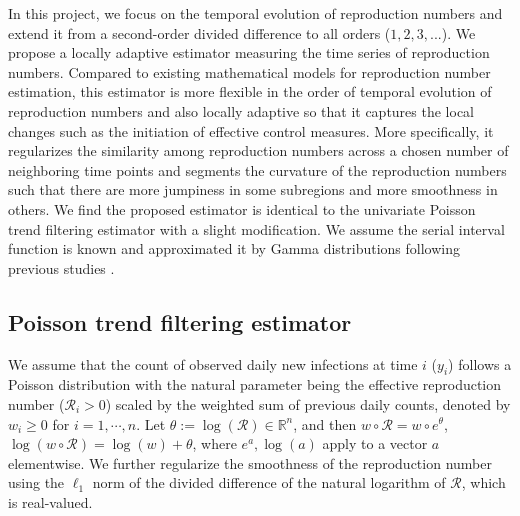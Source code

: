\documentclass[10pt,letterpaper]{article}
\def\calR{\mathcal{R}}
\begin{document}
In this project, we focus on the temporal evolution of reproduction numbers and extend it from a second-order divided difference to all orders ($1,2,3,...$). We propose a locally adaptive estimator measuring the time series of reproduction numbers. Compared to existing mathematical models for reproduction number estimation, this estimator is more flexible in the order of temporal evolution of reproduction numbers and also locally adaptive so that it captures the local changes such as the initiation of effective control measures. More specifically, it regularizes the similarity among reproduction numbers across a chosen number of neighboring time points and segments the curvature of the reproduction numbers such that there are more jumpiness in some subregions and more smoothness in others. We find the proposed estimator is identical to the univariate Poisson trend filtering estimator with a slight modification. We assume the serial interval function is known and approximated it by Gamma distributions following previous studies \cite{cori2013new,thompson2019improved,abry2020spatial,pascal2022nonsmooth}.

\subsection*{Poisson trend filtering estimator} %

We assume that the count of observed daily new infections at time $i$ ($y_i$) follows a Poisson distribution with the natural parameter being the effective reproduction number ($\calR_i > 0$) scaled by the weighted sum of previous daily counts, denoted by $w_i \geq 0$ for $i=1,\cdots,n$. %
Let $\theta:=\log(\calR) \in \mathbb{R}^n$, and then $w\circ \calR = w\circ e^{\theta}$, $\log(w\circ \calR) = \log(w) + \theta$, where $e^{a}, \log(a)$ apply to a vector $a$ elementwise. We further regularize the smoothness of the reproduction number using the $\ell_1$ norm of the divided difference of the natural logarithm of $\calR$, which is real-valued. 
\end{document}
